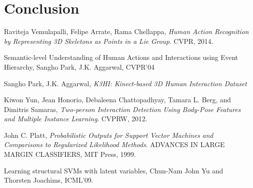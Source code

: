 \documentclass[10pt,twocolumn,letterpaper]{article}
\begin{document}
\section{Conclusion}


\begin{thebibliography}{9}

  Raviteja  Vemulapalli,
  Felipe Arrate,
  Rama Chellappa,
  \emph{Human Action Recognition by Representing 3D Skeletons as Points in a Lie Group}.
  CVPR,
  2014.

 Semantic-level Understanding of Human Actions and Interactions using Event Hierarchy, Sangho Park, J.K. Aggarwal, CVPR'04

	Sangho Park,
	J.K. Aggarwal,
	\emph{K3HI: Kinect-based 3D Human Interaction Dataset}

	Kiwon Yun, Jean Honorio, Debaleena Chattopadhyay, Tamara L. Berg, and Dimitris Samaras,
	\emph{Two-person Interaction Detection Using Body-Pose Features and Multiple Instance Learning}.
	CVPRW,
	2012.
	
	John C. Platt,
	\emph{Probabilistic Outputs for Support Vector Machines and Comparisons to Regularized Likelihood Methods}.
	ADVANCES IN LARGE MARGIN CLASSIFIERS, MIT Press, 1999.
	 
	

 Learning structural SVMs with latent variables, Chun-Nam John Yu and Thorsten Joachims, ICML'09.



\end{thebibliography}
\end{document}
